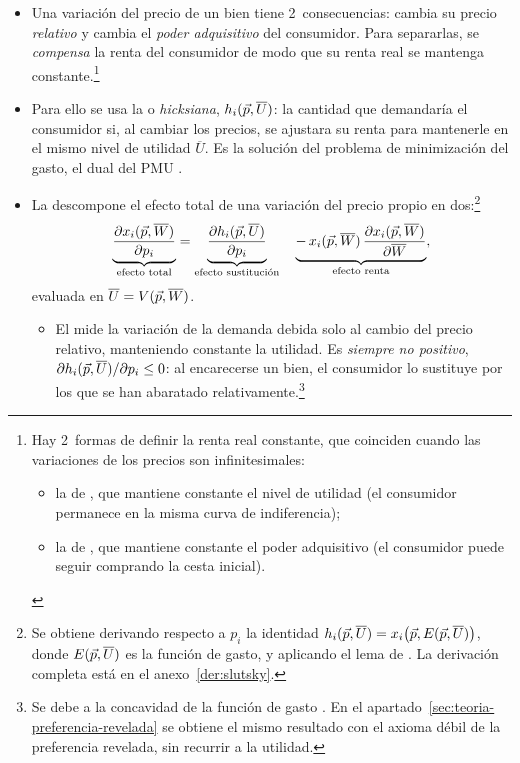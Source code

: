 \documentclass[11pt]{article}
\begin{document}
\begin{itemize}
\item Una variación del precio de un bien tiene 2~consecuencias: cambia su precio \emph{relativo} y cambia el \emph{poder adquisitivo} del consumidor. Para separarlas, se \emph{compensa} la renta del consumidor de modo que su renta real se mantenga constante.\footnote{Hay 2~formas de definir la renta real constante, que coinciden cuando las variaciones de los precios son infinitesimales:
\begin{itemize}
\item la de , que mantiene constante el nivel de utilidad (el consumidor permanece en la misma curva de indiferencia);
\item la de , que mantiene constante el poder adquisitivo (el consumidor puede seguir comprando la cesta inicial).
\end{itemize}}
\item Para ello se usa la  o \emph{hicksiana}, $h_i(\vec{p},\overline{U})$: la cantidad que demandaría el consumidor si, al cambiar los precios, se ajustara su renta para mantenerle en el mismo nivel de utilidad $\overline{U}$. Es la solución del problema de minimización del gasto, el dual del PMU .
\item La  \textcite{Slutsky1915Bilancio} descompone el efecto total de una variación del precio propio en dos:\footnote{Se obtiene derivando respecto a $p_i$ la identidad $h_i(\vec{p},\overline{U})=x_i\big(\vec{p},E(\vec{p},\overline{U})\big)$, donde $E(\vec{p},\overline{U})$ es la función de gasto, y aplicando el lema de  . La derivación completa está en el anexo~\ref{der:slutsky}.}
  \begin{equation}
  \underbrace{\frac{\partial x_i(\vec{p},\overline{W})}{\partial p_i}}_{\text{efecto total}}=\underbrace{\frac{\partial h_i(\vec{p},\overline{U})}{\partial p_i}}_{\text{efecto sustitución}}\quad\underbrace{-\,x_i(\vec{p},\overline{W})\,\frac{\partial x_i(\vec{p},\overline{W})}{\partial\overline{W}}}_{\text{efecto renta}}, \label{eq:slutsky}
  \end{equation}
  evaluada en $\overline{U}=V(\vec{p},\overline{W})$.
  \begin{itemize}
  \item El  mide la variación de la demanda debida solo al cambio del precio relativo, manteniendo constante la utilidad. Es \emph{siempre no positivo}, $\partial h_i(\vec{p},\overline{U})/\partial p_i\leq 0$: al encarecerse un bien, el consumidor lo sustituye por los que se han abaratado relativamente.\footnote{Se debe a la concavidad de la función de gasto . En el apartado~\ref{sec:teoria-preferencia-revelada} se obtiene el mismo resultado con el axioma débil de la preferencia revelada, sin recurrir a la utilidad.}

\end{itemize}
\end{itemize}
\end{document}
